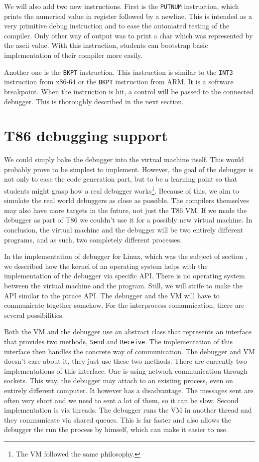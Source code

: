 We will also add two new instructions. First is  the \texttt{PUTNUM}
instruction, which prints the numerical value in register followed by a
newline. This is intended as a very primitive debug instruction and to ease the
automated testing of the compiler. Only other way of output was to print a char
which was represented by the ascii value. With this instruction, students can
bootstrap basic implementation of their compiler more easily.

Another one is the \texttt{BKPT} instruction. This instruction is similar to
the \texttt{INT3} instruction from x86-64 or the \texttt{BKPT} instruction from
ARM. It is a software breakpoint. When the instruction is hit, a control will
be passed to the connected debugger. This is thoroughly described in the next
section. 

\section{T86 debugging support}
We could simply bake the debugger into the virtual machine itself. This would
probably prove to be simplest to implement. However, the goal of the debugger
is not only to ease the code generation part, but to be a learning point so
that students might grasp how a real debugger works\footnote{The VM followed the
same philosophy.}. Because of this, we aim to simulate the real world debuggers
as close as possible. The compilers themselves may also have more targets in
the future, not just the T86 VM. If we made the debugger as part of T86 we
couldn't use it for a possibly new virtual machine. In conclusion, the virtual
machine and the debugger will be two entirely different programs, and as such,
two completely different processes.

In the implementation of debugger for Linux, which was the subject of section
, we described how the kernel of an operating system helps with the
implementation of the debugger via specific API. There is no operating system
between the virtual machine and the program. Still, we will strife to make the
API similar to the ptrace API. The debugger and the VM will have to communicate
together somehow. For the interprocess comunnication, there are several
possibilities.

Both the VM and the debugger use an abstract class that represents an interface
that provides two methods, \texttt{Send} and \texttt{Receive}. The implementation
of this interface then handles the concrete way of communication. The debugger
and VM doesn't care about it, they just use these two methods. There are currently
two implementations of this interface. One is using network communication through
sockets. This way, the debugger may attach to an existing process, even on
entirely different computer. It however has a disadvantage. The messages sent
are often very short and we need to sent a lot of them, so it can be slow.
Second implementation is via threads. The debugger runs the VM in another
thread and they communicate via shared queues. This is far faster and also
allows the debugger the run the process by himself, which can make it easier
to use.

